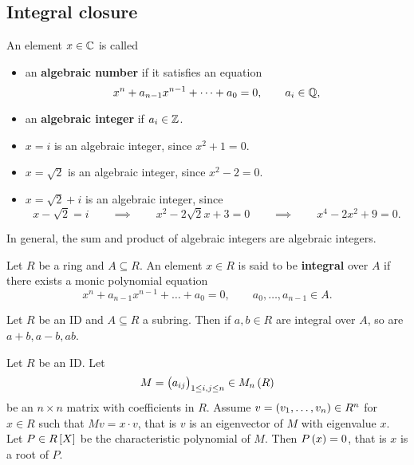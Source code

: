 \pagebreak

\subsection{Integral closure}

\begin{definition}
An element $ x \in \mathbb{C} $ is called
\begin{itemize}
\item an \textbf{algebraic number} if it satisfies an equation
$$ x^n + a_{n - 1}x^{n - 1} + \dots + a_0 = 0, \qquad a_i \in \mathbb{Q}, $$
\item an \textbf{algebraic integer} if $ a_i \in \mathbb{Z} $.
\end{itemize}
\end{definition}

\begin{example*}
\hfill
\begin{itemize}
\item $ x = i $ is an algebraic integer, since $ x^2 + 1 = 0 $.
\item $ x = \sqrt{2} $ is an algebraic integer, since $ x^2 - 2 = 0 $.
\item $ x = \sqrt{2} + i $ is an algebraic integer, since
$$ x - \sqrt{2} = i \qquad \implies \qquad x^2 - 2\sqrt{2}x + 3 = 0 \qquad \implies \qquad x^4 - 2x^2 + 9 = 0. $$
\end{itemize}
\end{example*}

In general, the sum and product of algebraic integers are algebraic integers.

\begin{definition}
Let $ R $ be a ring and $ A \subseteq R $. An element $ x \in R $ is said to be \textbf{integral} over $ A $ if there exists a monic polynomial equation
$$ x^n + a_{n - 1}x^{n - 1} + \dots + a_0 = 0, \qquad a_0, \dots, a_{n - 1} \in A. $$
\end{definition}

\begin{theorem}
\label{thm:integralsubring}
Let $ R $ be an ID and $ A \subseteq R $ a subring. Then if $ a, b \in R $ are integral over $ A $, so are $ a + b, a - b, ab $.
\end{theorem}

\begin{lemma}
\label{lem:cayleyhamilton}
Let $ R $ be an ID. Let
$$ M = \br{a_{ij}}_{1 \le i, j \le n} \in M_n\br{R} $$
be an $ n \times n $ matrix with coefficients in $ R $. Assume $ v = \br{v_1, \dots, v_n} \in R^n $ for $ x \in R $ such that $ Mv = x \cdot v $, that is $ v $ is an eigenvector of $ M $ with eigenvalue $ x $. Let $ P \in R\sbr{X} $ be the characteristic polynomial of $ M $. Then $ P\br{x} = 0 $, that is $ x $ is a root of $ P $.
\end{lemma}

